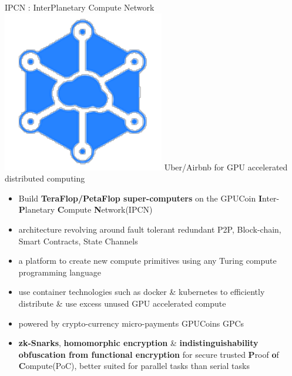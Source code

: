\begin{frame}[t]{IPCN
	: InterPlanetary Compute Network}
	\includegraphics[scale=.15]{static/ipcn-p2p}
	 Uber/Airbnb for GPU accelerated distributed computing
 \begin{itemize}[<+-| alert@+>]
 \item Build \textbf{TeraFlop/PetaFlop super-computers} on the GPUCoin \textbf{I}nter-\textbf{P}lanetary \textbf{C}ompute \textbf{N}etwork(IPCN)
 \item architecture revolving around fault tolerant redundant P2P, Block-chain, Smart Contracts, State Channels
 \item a platform to create new compute primitives using any Turing compute programming language
 \item use container technologies such as docker \& kubernetes to efficiently distribute \& use excess unused GPU accelerated compute
 \item powered by crypto-currency micro-payments GPUCoins GPCs
 \item \textbf{zk-Snarks}, \textbf{homomorphic encryption} \& \textbf{indistinguishability obfuscation from functional encryption} for secure trusted \textbf{P}roof \textbf{o}f \textbf{C}ompute(PoC), better suited for parallel tasks than serial tasks
 \end{itemize}
\end{frame}